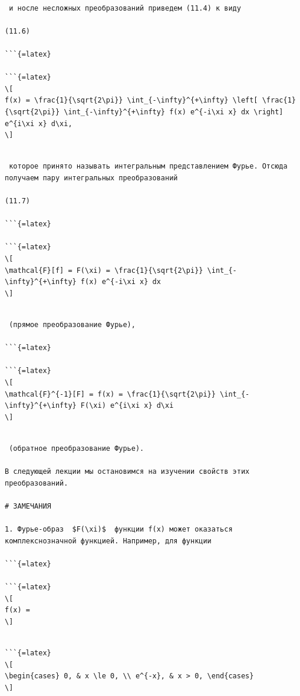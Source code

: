 \documentclass[
  ukrainian,
]{article}
\begin{document}
\begin{verbatim}

 и носле несложных преобразований приведем (11.4) к виду

(11.6) 

```{=latex}

```{=latex}
\[
f(x) = \frac{1}{\sqrt{2\pi}} \int_{-\infty}^{+\infty} \left[ \frac{1}{\sqrt{2\pi}} \int_{-\infty}^{+\infty} f(x) e^{-i\xi x} dx \right] e^{i\xi x} d\xi,
\]
\end{verbatim}

\begin{verbatim}

 которое принято называть интегральным представлением Фурье. Отсюда получаем пару интегральных преобразований

(11.7) 

```{=latex}

```{=latex}
\[
\mathcal{F}[f] = F(\xi) = \frac{1}{\sqrt{2\pi}} \int_{-\infty}^{+\infty} f(x) e^{-i\xi x} dx
\]
\end{verbatim}

\begin{verbatim}

 (прямое преобразование Фурье), 

```{=latex}

```{=latex}
\[
\mathcal{F}^{-1}[F] = f(x) = \frac{1}{\sqrt{2\pi}} \int_{-\infty}^{+\infty} F(\xi) e^{i\xi x} d\xi
\]
\end{verbatim}

\begin{verbatim}

 (обратное преобразование Фурье).

В следующей лекции мы остановимся на изучении свойств этих преобразований.

# ЗАМЕЧАНИЯ

1. Фурье-образ  $F(\xi)$  функции f(x) может оказаться комплекснозначной функцией. Например, для функции

```{=latex}

```{=latex}
\[
f(x) =
\]
\end{verbatim}

\begin{verbatim}

```{=latex}
\[
\begin{cases} 0, & x \le 0, \\ e^{-x}, & x > 0, \end{cases}
\]
\end{verbatim}
\end{document}
